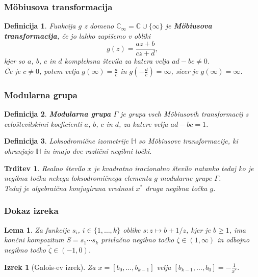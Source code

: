 \documentclass{beamer}
\newtheorem{izrek}[theorem]{Izrek}
\newtheorem{trditev}[theorem]{Trditev}
\newtheorem{lema}[theorem]{Lema}
\newtheorem{definicija}{Definicija}
\begin{document}
\begin{frame}
\frametitle{M\"obiusova transformacija}
\begin{definicija}
    Funkcija $g$ z domeno $\mathbb{C}_{\infty} = \mathbb{C} \cup \{\infty\}$ je \textbf{M\"obiusova transformacija}, če jo lahko zapišemo v obliki
    \[
        g(z) = \frac{az + b}{cz + d},
    \]
    kjer so $a$, $b$, $c$ in $d$ kompleksna števila za katera velja $ad - bc \neq 0$. \\
    Če je $c \neq 0$, potem velja $g(\infty) = \frac{a}{c}$ in $g(-\frac{d}{c}) = \infty$, sicer je $g(\infty) = \infty$.
\end{definicija}
\end{frame}

\begin{frame}
\frametitle{Modularna grupa}
\begin{definicija}
    \textbf{Modularna grupa} $\Gamma$ je grupa vseh M\"obiusovih transformacij s celoštevilskimi koeficienti $a$, $b$, $c$ in $d$, za katere velja $ad - bc = 1$.
\end{definicija}
\pause
\begin{definicija}
    Loksodromične izometrije $\mathbb{H}$ so M\"obiusove transformacije, ki ohranjajo $\mathbb{H}$ in imajo dve različni negibni točki. 
\end{definicija}
\pause
\begin{trditev}
    Realno število $x$ je kvadratno iracionalno število natanko tedaj ko je negibna točka nekega loksodromičnega elementa $g$ modularne grupe $\Gamma$.\\
    Tedaj je algebraična konjugirana vrednost $x^*$ druga negibna točka $g$.
\end{trditev}

\end{frame}

\begin{frame}
\frametitle{Dokaz izreka}
\begin{lema}
    Za funkcije $s_i$, $i \in \{1, \ldots, k\}$ oblike $s : z \mapsto b + 1/z$, kjer je $b \geq 1$, ima končni kompozitum $S = s_1 \cdots s_k$ privlačno negibno točko $\zeta \in (1, \infty)$ in odbojno negibno točko $\tilde{\zeta} \in (-1, 0)$. 
\end{lema}

\end{frame}
\begin{frame}

\begin{izrek}[Galois-ev izrek]
    Za $x = \overline{[b_0, \ldots, b_{k-1}]}$ velja $\overline{[b_{k-1}, \ldots, b_0]} = - \frac{1}{x^*}.$
\end{izrek}

\end{frame}

\end{document}
